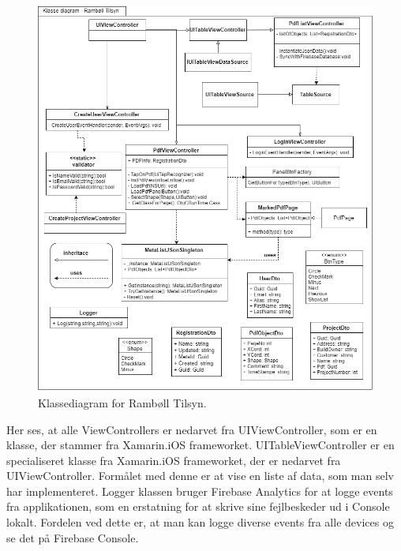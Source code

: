 \begin{figure}[H] %
	\centering
	\includegraphics[height=13cm, width=17cm]{../ArkitekturDesign/OverordnetArkitektur/KlasseDiagram}
	\caption{Klassediagram for Rambøll Tilsyn.}
	\label{fig:KlasseDiagram}
\end{figure}

Her ses, at alle ViewControllers er nedarvet fra UIViewController\cite{UIViewController}, som er en klasse, der stammer fra Xamarin.iOS frameworket. UITableViewController er en specialiseret klasse fra Xamarin.iOS frameworket, der er nedarvet fra UIViewController. Formålet med denne er at vise en liste af data, som man selv har implementeret. Logger klassen bruger Firebase Analytics\cite{FirebaseAnalytic} for at logge events fra applikationen, som en erstatning for at skrive sine fejlbeskeder ud i Console lokalt\cite{CON}. Fordelen ved dette er, at man kan logge diverse events fra alle devices og se det på Firebase Console.  
